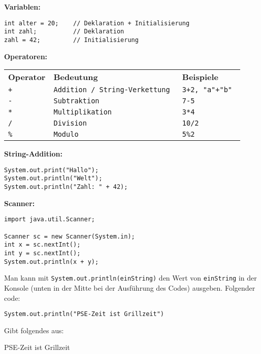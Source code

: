 \documentclass{../../sheet}
\begin{document}
\textbf{Variablen:}
\begin{center}
    \begin{verbatim}
int alter = 20;    // Deklaration + Initialisierung
int zahl;          // Deklaration
zahl = 42;         // Initialisierung
  \end{verbatim}
\end{center}
  \bigskip
  \textbf{Operatoren:}
  \begin{center}
    \begin{tabular}{l l l}
      \rowcolor{tablehead}
      \textbf{Operator
      }           & \textbf{Bedeutung
      }           & \textbf{Beispiele
      }                                           \\
      \texttt{+}  & \texttt{Addition / String-Verkettung
      }           & \texttt{3+2, "a"+"b"
      }                                           \\
      \texttt{-}  & \texttt{Subtraktion
      }           & \texttt{7-5
      }                                           \\
      \texttt{*}  & \texttt{Multiplikation
      }           & \texttt{3*4
      }                                           \\
      \texttt{/}  & \texttt{Division
      }           & \texttt{10/2
      }                                           \\
      \texttt{\%} & \texttt{Modulo
      }           & \texttt{5\%2
      }                                           \\
    \end{tabular}
\end{center}
\bigskip
\textbf{String-Addition:}
\begin{verbatim}
System.out.print("Hallo");
System.out.println("Welt");
System.out.println("Zahl: " + 42);
  \end{verbatim}
\bigskip
\textbf{Scanner:}
  \begin{verbatim}
import java.util.Scanner;

Scanner sc = new Scanner(System.in);
int x = sc.nextInt();
int y = sc.nextInt();
System.out.println(x + y);
  \end{verbatim}
\newpage


Man kann mit \texttt{System.out.println(einString)} den Wert von \texttt{einString} in der Konsole (unten in der Mitte bei der Ausführung des Codes) ausgeben. Folgender code:
\begin{verbatim}
System.out.println("PSE-Zeit ist Grillzeit")
\end{verbatim}
Gibt folgendes aus:
\begin{ausgabe}
    PSE-Zeit ist Grillzeit
\end{ausgabe}
\end{document}
